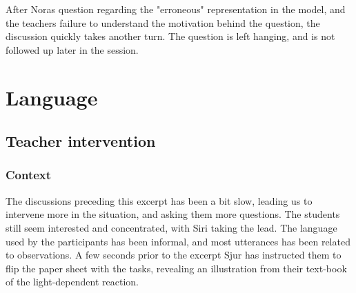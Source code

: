 After Noras question regarding the "erroneous" representation in the model, and the teachers failure to understand the motivation behind the question, the discussion quickly takes another turn. The question is left hanging, and is not followed up later in the session.  


\section{Language}

\subsection{Teacher intervention}

\subsubsection*{Context}
The discussions preceding this excerpt has been a bit slow, leading us to intervene more in the situation, and asking them more questions. The students still seem interested and concentrated, with Siri taking the lead. The language used by the participants has been informal, and most utterances has been related to observations. A few seconds prior to the excerpt Sjur has instructed them to flip the paper sheet with the tasks, revealing an illustration from their text-book of the light-dependent reaction. 
